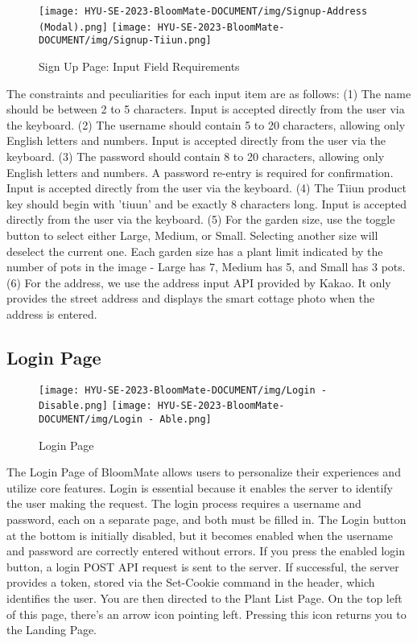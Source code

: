 \documentclass[conference, a4paper]{IEEEtran}
\begin{document}
    \begin{figure}[h]
    \centerline{
        \texttt{[image: HYU-SE-2023-BloomMate-DOCUMENT/img/Signup-Address (Modal).png]}
        \texttt{[image: HYU-SE-2023-BloomMate-DOCUMENT/img/Signup-Tiiun.png]}
    }
    \label{fig}
    \caption{Sign Up Page: Input Field Requirements}
    \end{figure}
    
The constraints and peculiarities for each input item are as follows: (1) The name should be between 2 to 5 characters. Input is accepted directly from the user via the keyboard. (2) The username should contain 5 to 20 characters, allowing only English letters and numbers. Input is accepted directly from the user via the keyboard. (3) The password should contain 8 to 20 characters, allowing only English letters and numbers. A password re-entry is required for confirmation. Input is accepted directly from the user via the keyboard. (4) The Tiiun product key should begin with 'tiuun' and be exactly 8 characters long. Input is accepted directly from the user via the keyboard. (5) For the garden size, use the toggle button to select either Large, Medium, or Small. Selecting another size will deselect the current one. Each garden size has a plant limit indicated by the number of pots in the image - Large has 7, Medium has 5, and Small has 3 pots. (6) For the address, we use the address input API provided by Kakao. It only provides the street address and displays the smart cottage photo when the address is entered.


\subsection{Login Page}
    \begin{figure}[h]
    \centerline{
        \texttt{[image: HYU-SE-2023-BloomMate-DOCUMENT/img/Login - Disable.png]}
        \texttt{[image: HYU-SE-2023-BloomMate-DOCUMENT/img/Login - Able.png]}
    }
    \label{fig}
    \caption{Login Page}
    \end{figure}
The Login Page of BloomMate allows users to personalize their experiences and utilize core features. Login is essential because it enables the server to identify the user making the request. The login process requires a username and password, each on a separate page, and both must be filled in. The Login button at the bottom is initially disabled, but it becomes enabled when the username and password are correctly entered without errors. If you press the enabled login button, a login POST API request is sent to the server. If successful, the server provides a token, stored via the Set-Cookie command in the header, which identifies the user. You are then directed to the Plant List Page. On the top left of this page, there's an arrow icon pointing left. Pressing this icon returns you to the Landing Page.
\end{document}
